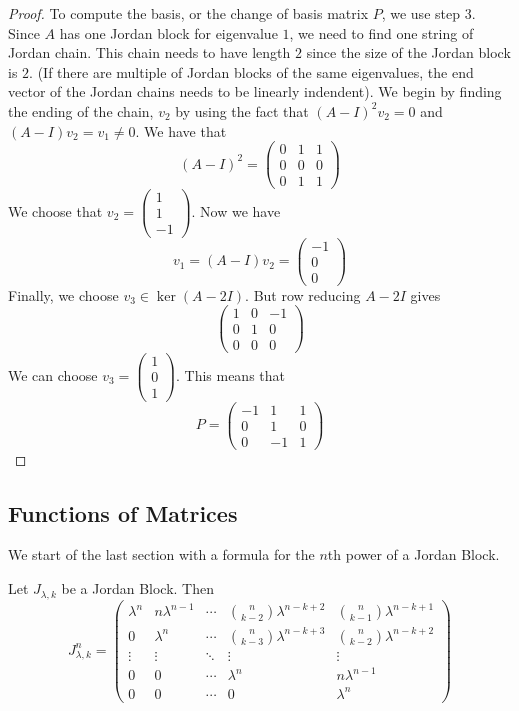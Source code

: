 \begin{eg}{}{}
\begin{proof}
To compute the basis, or the change of basis matrix $P$, we use step $3$. Since $A$ has one Jordan block for eigenvalue $1$, we need to find one string of Jordan chain. This chain needs to have length $2$ since the size of the Jordan block is $2$. (If there are multiple of Jordan blocks of the same eigenvalues, the end vector of the Jordan chains needs to be linearly indendent). We begin by finding the ending of the chain, $v_2$ by using the fact that $(A-I)^2v_2=0$ and $(A-I)v_2=v_1\neq 0$. We have that $$(A-I)^2=\begin{pmatrix}
0 & 1 & 1\\
0 & 0 & 0\\
0 & 1 & 1
\end{pmatrix}$$
We choose that $v_2=\begin{pmatrix}1\\ 1\\ -1\end{pmatrix}$. Now we have $$v_1=(A-I)v_2=\begin{pmatrix}-1\\ 0\\ 0 \end{pmatrix}$$ Finally, we choose $v_3\in\ker(A-2I)$. But row reducing $A-2I$ gives $$\begin{pmatrix}
1 & 0 & -1\\
0 & 1 & 0\\
0 & 0 & 0
\end{pmatrix}$$
We can choose $v_3=\begin{pmatrix}1\\ 0\\ 1\end{pmatrix}$. This means that $$P=\begin{pmatrix}
-1 & 1 & 1\\
0 & 1 & 0\\
0 & -1 & 1
\end{pmatrix}$$
\end{proof}
\end{eg}

\subsection{Functions of Matrices}
We start of the last section with a formula for the $n$th power of a Jordan Block. 
\begin{lmm}{}{} Let $J_{\lambda,k}$ be a Jordan Block. Then $$J_{\lambda,k}^n=\begin{pmatrix}
\lambda^n & n\lambda^{n-1} & \cdots & \binom{n}{k-2}\lambda^{n-k+2} & \binom{n}{k-1}\lambda^{n-k+1}\\
0 & \lambda^n & \cdots & \binom{n}{k-3}\lambda^{n-k+3} & \binom{n}{k-2}\lambda^{n-k+2}\\
\vdots & \vdots & \ddots & \vdots & \vdots\\
0 & 0 & \cdots & \lambda^n & n\lambda^{n-1}\\
0 & 0 & \cdots & 0 & \lambda^n
\end{pmatrix}$$
\end{lmm}


